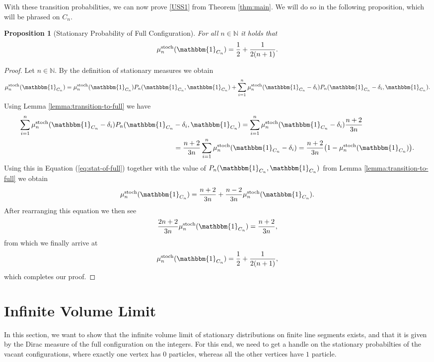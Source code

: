\documentclass[11pt]{article}
\newtheorem{proposition}{Proposition}[section]
\newcommand{\N}{\mathbb{N}}
\newcommand{\stoch}{\text{stoch}}
\newcommand{\statn}[1]{\mu^{\stoch}_{#1}}
\newcommand{\one}{\mathbbm{1}}
\newcommand{\trans}[1]{P_{#1}}
\begin{document}
With these transition probabilities, we can now prove \ref{USS1} from Theorem \ref{thm:main}. We will do so in the following proposition, which will be phrased on $C_n$.

\begin{proposition}[Stationary Probability of Full Configuration]\label{prop:concentration-on-full}
    For all $n\in\N$ it holds that
    $$\statn{n}(\one_{C_n})=\frac{1}{2}+\frac{1}{2(n+1)}.$$
\end{proposition}
\begin{proof}
    Let $n\in\N$. By the definition of stationary measures we obtain
    \begin{align}\label{eq:stat-of-full}
    \statn{n}(\one_{C_n})=\statn{n}(\one_{C_n})\trans{n}(\one_{C_n},\one_{C_n})+\sum_{i=1}^n\statn{n}(\one_{C_n}-\delta_i)\trans{n}(\one_{C_n}-\delta_i,\one_{C_n}).
    \end{align}
    Using Lemma \ref{lemma:transition-to-full} we have
    \begin{align*}
        \sum_{i=1}^n\statn{n}(\one_{C_n}-\delta_i)\trans{n}(\one_{C_n}&-\delta_i,\one_{C_n})=\sum_{i=1}^n\statn{n}(\one_{C_n}-\delta_i)\frac{n+2}{3n}\\&=\frac{n+2}{3n}\sum_{i=1}^n\statn{n}(\one_{C_n}-\delta_i)=\frac{n+2}{3n}\big(1-\statn{n}({\one_{C_n}})\big).
    \end{align*}
    Using this in Equation (\ref{eq:stat-of-full}) together with the value of $\trans{n}(\one_{C_n},\one_{C_n})$ from Lemma \ref{lemma:transition-to-full} we obtain
    $$\statn{n}(\one_{C_n})=\frac{n+2}{3n}+\frac{n-2}{3n}\statn{n}(\one_{C_n}).$$
    After rearranging this equation we then see
    $$\frac{2n+2}{3n}\statn{n}(\one_{C_n})=\frac{n+2}{3n},$$
    from which we finally arrive at
    $$\statn{n}(\one_{C_n})=\frac{1}{2}+\frac{1}{2(n+1)},$$
    which completes our proof.
\end{proof}
\section{Infinite Volume Limit}\label{sec:infinite-volume-limit}
In this section, we want to show that the infinite volume limit of stationary distributions on finite line segments exists, and that it is given by the Dirac measure of the full configuration on the integers. For this end, we need to get a handle on the stationary probabilties of the vacant configurations, where exactly one vertex has $0$ particles, whereas all the other vertices have $1$ particle.
\end{document}
